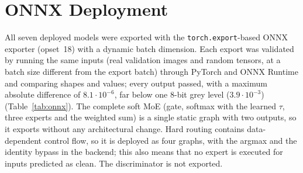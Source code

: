 \documentclass[conference]{IEEEtran}
\begin{document}
\FloatBarrier
\section{ONNX Deployment}
\begin{table}[t]\centering\caption{PyTorch vs.\ ONNX Runtime on real validation inputs plus random inputs
(tolerance: \texttt{np.allclose}, atol $10^{-4}$, rtol $10^{-3}$).}\label{tab:onnx}\footnotesize
\setlength{\tabcolsep}{3pt}
\end{table}
All seven deployed models were exported with the \texttt{torch.export}-based ONNX exporter (opset~18) with
a dynamic batch dimension. Each export was validated by running the same inputs (real validation images and
random tensors, at a batch size different from the export batch) through PyTorch and ONNX Runtime and
comparing shapes and values; every output passed, with a maximum absolute difference of $8.1\cdot10^{-6}$,
far below one 8-bit grey level ($3.9\cdot10^{-3}$) (Table~\ref{tab:onnx}). The complete soft MoE (gate,
softmax with the learned $\tau$, three experts and the weighted sum) is a single static graph with two outputs,
so it exports without any architectural change. Hard routing contains data-dependent control flow, so it is
deployed as four graphs, with the argmax and the identity bypass in the backend; this also means that no
expert is executed for inputs predicted as clean. The discriminator is not exported.
\end{document}
